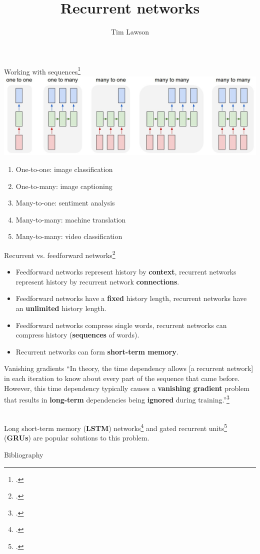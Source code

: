 \documentclass[10pt]{beamer}
\title{Recurrent networks}
\author{Tim Lawson}
\begin{document}
\maketitle

\begin{frame}
  {Working with sequences\footcite{Karpathy2015}}
  \includegraphics[width=\textwidth]{diags}
  \begin{enumerate}
    \item One-to-one: image classification
    \item One-to-many: image captioning
    \item Many-to-one: sentiment analysis
    \item Many-to-many: machine translation
    \item Many-to-many: video classification
  \end{enumerate}
\end{frame}

\begin{frame}
  {Recurrent vs. feedforward networks\footcite{Mikolov2010}}
  \begin{itemize}
    \item Feedforward networks represent history by \textbf{context}, recurrent
          networks represent history by recurrent network \textbf{connections}.
    \item Feedforward networks have a \textbf{fixed} history length, recurrent
          networks have an \textbf{unlimited} history length.
    \item Feedforward networks compress single words, recurrent networks can
          compress history (\textbf{sequences} of words).
    \item Recurrent networks can form \textbf{short-term memory}.
  \end{itemize}
\end{frame}

\begin{frame}
  {Vanishing gradients}
  \enquote{In theory, the time dependency allows [a recurrent network] in each
    iteration to know about every part of the sequence that came before.
    However, this time dependency typically causes a \textbf{vanishing gradient}
    problem that results in \textbf{long-term} dependencies being
    \textbf{ignored} during training.}\footcite{Madsen2019,Pascanu2013}
  \\~\

  Long short-term memory (\textbf{LSTM})
  networks\footcite{Hochreiter1997,Olah2015} and gated recurrent
  units\footcite{Cho2014} (\textbf{GRUs}) are popular solutions to this
  problem.
\end{frame}

\begin{frame}
  {Bibliography}
  \renewcommand*{\bibfont}{\footnotesize}
  \printbibliography
\end{frame}
\end{document}
